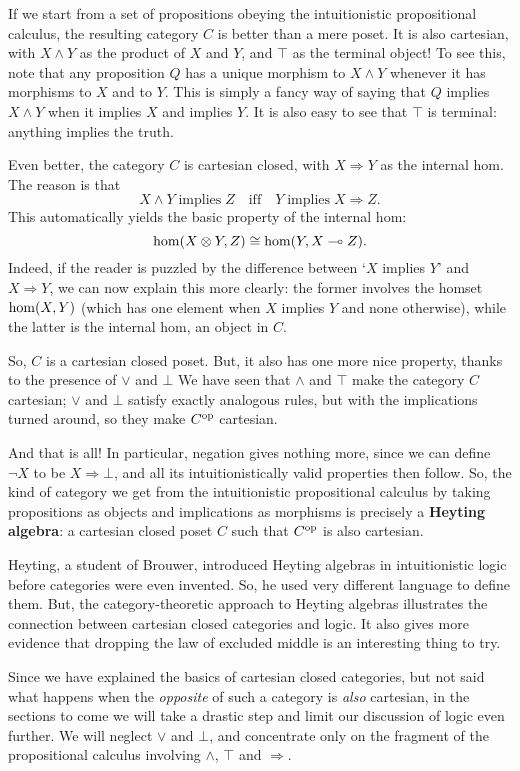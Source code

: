\documentclass[12pt]{article}
\newcommand{\lhom}{\multimap}
\renewcommand{\hom}{{\rm hom}}
\newcommand{\tensor}{\otimes}
\newcommand{\op}{{\rm op}}
\begin{document}
If we start from a set of propositions obeying the intuitionistic
propositional calculus, the resulting category $C$ is better
than a mere poset.  It is also cartesian, with $X \wedge Y$ as the product 
of $X$ and $Y$, and $\top$ as the terminal object!  To see this, note
that any proposition $Q$ has a unique morphism to $X \wedge Y$ whenever 
it has morphisms to $X$ and to $Y$.  This is simply a fancy way of
saying that $Q$ implies $X \wedge Y$ when it implies $X$ and implies $Y$.  
It is also easy to see that $\top$ is terminal: anything implies 
the truth.  

Even better, the category $C$ is cartesian closed, with 
$ X \Rightarrow Y$ as the internal hom.  The reason is that 
\[  X \wedge Y \; \text{implies}\; Z \quad \text{iff} \quad Y 
\; \text{implies} \; X \Rightarrow Z .\]
This automatically yields the basic property of the internal
hom:
\[ \hom(X\tensor Y, Z) \cong \hom(Y,X \lhom Z)  . \]
Indeed, if the reader is puzzled by the difference between 
`$X$ implies $Y$' and $X \Rightarrow Y$, we can now explain
this more clearly: the former involves the homset $\hom(X,Y)$ 
(which has one element when $X$ implies $Y$ and none otherwise), 
while the latter is the internal hom, an object in $C$.

So, $C$ is a cartesian closed poset.  But, it also has
one more nice property, thanks to the presence of $\vee$ and $\bot$
We have seen that $\wedge$ and $\top$ make the category $C$ cartesian; 
$\vee$ and $\bot$ satisfy exactly analogous rules, but with the 
implications turned around, so they make $C^\op$ cartesian.  

And that is all!  In particular, negation gives nothing more, since we
can define $\neg X$ to be $X \Rightarrow \bot$, and all its
intuitionistically valid properties then follow.  So, the kind of
category we get from the intuitionistic propositional calculus by
taking propositions as objects and implications as morphisms is
precisely a {\bf Heyting algebra}: a cartesian closed poset $C$ such
that $C^\op$ is also cartesian.

Heyting, a student of Brouwer, introduced Heyting algebras in
intuitionistic logic before categories were even invented.  
So, he used very different language to define them.   But, the
category-theoretic approach to Heyting algebras illustrates the
connection between cartesian closed categories and logic.
It also gives more evidence that dropping the law of 
excluded middle is an interesting thing to try.

Since we have explained the basics of cartesian closed categories,
but not said what happens when the {\it opposite} of such a category 
is {\it also} cartesian, in the sections to come we will take a
drastic step and limit our discussion of logic even further.   
We will neglect $\vee$ and $\bot$, and concentrate only on the 
fragment of the propositional calculus involving $\wedge$, $\top$ and 
$\Rightarrow$.  
\end{document}
